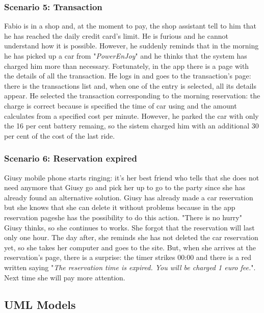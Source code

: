 \subsubsection{Scenario 5: Transaction} \label{sce5}
Fabio is in a shop and, at the moment to pay, the shop assistant tell to him that he has reached the daily credit card's limit. He is furious and he cannot understand how it is possible. However, he suddenly reminds that in the morning he has picked up a car from "\textit{PowerEnJoy}" and he thinks that the system has charged him more than necessary. Fortunately, in the app there is a page with the details of all the transaction. He logs in and goes to the transaction's page: there is the transactions list and, when one of the entry is selected, all its details appear. He selected the transaction corresponding to the morning reservation: the charge is correct because is specified the time of car using and the amount calculates from a specified cost per minute. 
However, he parked the car with only the 16 per cent battery remaing, so the sistem charged him with an additional 30 per cent of the cost of the last ride.
\subsubsection{Scenario 6: Reservation expired} \label{sce6}
Giusy mobile phone starts ringing: it's her best friend who tells that she does not need 
anymore that Giusy go and pick her up to go to the party since she has already found an alternative solution.
Giusy has already made a car reservation but she knows that she can delete it without problems because in the app reservation pageshe has the possibility to do this action. "There is no hurry" Giusy thinks, so she continues to works. She forgot that the reservation will last only one hour. The day after, she reminds she has not deleted the car reservation yet, so she takes her computer and goes to the site. But, when she arrives at the reservation's page, there is a surprise: the timer strikes 00:00 and there is a red written saying "\textit{The reservation time is expired. You will be charged 1 euro fee.}". Next time she will pay more attention. 
\clearpage  


\subsection{UML Models}
